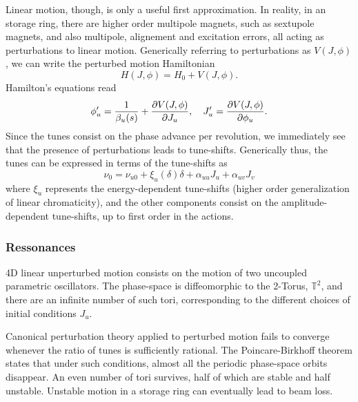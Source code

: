 Linear motion, though, is only a useful first approximation. In reality, in an storage ring, there are higher order multipole magnets, such as sextupole magnets, and also multipole, alignement and excitation errors, all acting as perturbations to linear motion. Generically referring to perturbations as $V(J, \phi)$, we can write the perturbed motion Hamiltonian
\begin{equation}
    H(J,\phi) =H_0 + V(J,\phi).
\end{equation}
Hamilton's equations read
\begin{equation}
\phi_u^\prime = \frac{1}{\beta_u(s)}+\pdv{V(J,\phi)}{J_u}, \quad J_u^\prime = \pdv{V(J,\phi)}{\phi_u}.
\end{equation}
Since the tunes consist on the phase advance per revolution, we immediately see that the presence of perturbations leads to tune-shifts. Generically thus, the tunes can be expressed in terms of the tune-shifts as
$$\nu_0 = \nu_{u0} + \xi_u(\delta) \delta + \alpha_{uu} J_u + \alpha_{uv} J_v$$
where $\xi_u$ represents the energy-dependent tune-shifts (higher order generalization of linear chromaticity), and the other components consist on the amplitude-dependent tune-shifts, up to first order in the actions.


\subsubsection{Ressonances}
4D linear unperturbed motion consists on the motion of two uncoupled parametric oscillators. The phase-space is diffeomorphic to the 2-Torus, $\mathbb{T}^2$, and there are an infinite number of such tori, corresponding to the different choices of initial conditions $J_u$.

Canonical perturbation theory applied to perturbed motion fails to converge whenever the ratio of tunes is sufficiently rational. The Poincare-Birkhoff theorem states that under such conditions, almost all the periodic phase-space orbits disappear. An even number of tori survives, half of which are stable and half unstable. Unstable motion in a storage ring can eventually lead to beam loss.

